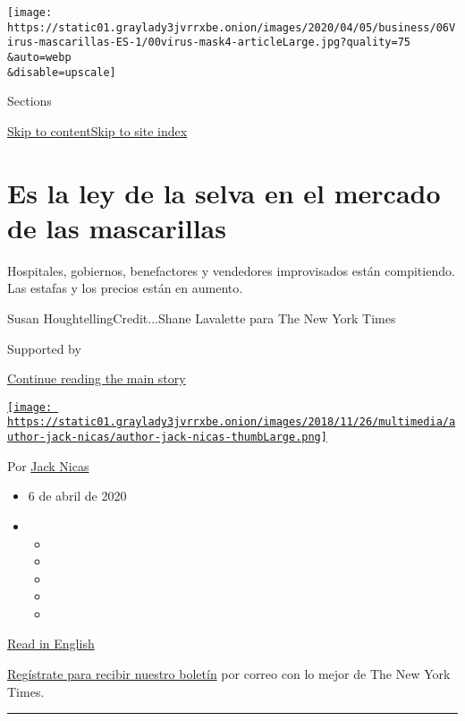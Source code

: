 \texttt{[image: https://static01.graylady3jvrrxbe.onion/images/2020/04/05/business/06Virus-mascarillas-ES-1/00virus-mask4-articleLarge.jpg?quality=75\\\&auto=webp\\\&disable=upscale]}

Sections

\protect\hyperlink{site-content}{Skip to
content}\protect\hyperlink{site-index}{Skip to site index}

\hypertarget{es-la-ley-de-la-selva-en-el-mercado-de-las-mascarillas}{%
\section{Es la ley de la selva en el mercado de las
mascarillas}\label{es-la-ley-de-la-selva-en-el-mercado-de-las-mascarillas}}

Hospitales, gobiernos, benefactores y vendedores improvisados están
compitiendo. Las estafas y los precios están en aumento.

Susan HoughtellingCredit...Shane Lavalette para The New York Times

Supported by

\protect\hyperlink{after-sponsor}{Continue reading the main story}

\href{https://www.nytimes3xbfgragh.onion/by/jack-nicas}{\texttt{[image: https://static01.graylady3jvrrxbe.onion/images/2018/11/26/multimedia/author-jack-nicas/author-jack-nicas-thumbLarge.png]}}

Por \href{https://www.nytimes3xbfgragh.onion/by/jack-nicas}{Jack Nicas}

\begin{itemize}
\item
  6 de abril de 2020
\item
  \begin{itemize}
  \item
  \item
  \item
  \item
  \item
  \end{itemize}
\end{itemize}

\href{https://www.nytimes3xbfgragh.onion/2020/04/03/technology/coronavirus-masks-shortage.html}{Read
in English}

\href{https://www.nytimes3xbfgragh.onion/newsletters/el-times}{Regístrate
para recibir nuestro boletín} por correo con lo mejor de The New York
Times.

\begin{center}\rule{0.5\linewidth}{\linethickness}\end{center}


